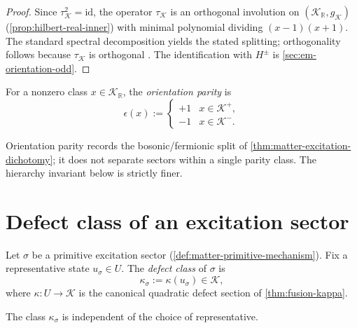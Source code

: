 \begin{proof}
Since $\tau_{\mathcal K}^2 = \mathrm{id}$, the operator $\tau_{\mathcal K}$
is an orthogonal involution on $(\mathcal K_{\mathbb R}, g_{\mathcal K})$
(\cref{prop:hilbert-real-inner}) with minimal polynomial dividing
$(x-1)(x+1)$.
The standard spectral decomposition yields the stated splitting;
orthogonality follows because $\tau_{\mathcal K}$ is orthogonal
\cite{Kato1995}.
The identification with $H^\pm$ is \cref{sec:em-orientation-odd}.
\end{proof}

\begin{definition}
\label{def:spectral-orientation-parity}
For a nonzero class $x \in \mathcal K_{\mathbb R}$, the
\emph{orientation parity} is
\[
  \epsilon(x) :=
  \begin{cases}
    +1 & x \in \mathcal K^+, \\
    -1 & x \in \mathcal K^-.
  \end{cases}
\]
\end{definition}

\begin{remark}
\label{rem:parity-not-hierarchy}
Orientation parity records the bosonic/fermionic split of
\cref{thm:matter-excitation-dichotomy}; it does not separate sectors
within a single parity class.
The hierarchy invariant below is strictly finer.
\end{remark}

\section{Defect class of an excitation sector}
\label{sec:spectral-defect}

\begin{definition}
\label{def:spectral-defect-class}
Let $\sigma$ be a primitive excitation sector
(\cref{def:matter-primitive-mechanism}).
Fix a representative state $u_\sigma \in U$.
The \emph{defect class} of $\sigma$ is
\[
  \kappa_\sigma := \kappa(u_\sigma) \in \mathcal K,
\]
where $\kappa : U \to \mathcal K$ is the canonical quadratic defect
section of \cref{thm:fusion-kappa}.
\end{definition}

\begin{lemma}
\label{lem:spectral-defect-welldefined}
The class $\kappa_\sigma$ is independent of the choice of representative.
\end{lemma}

